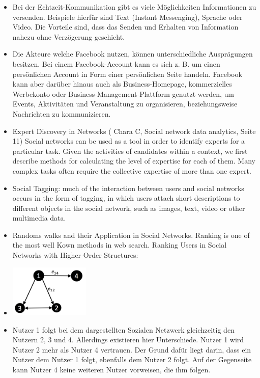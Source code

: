\begin{itemize}
\item Bei der Echtzeit-Kommunikation gibt es viele Möglichkeiten Informationen zu versenden. Beispiele hierfür sind Text (Instant Messenging), Sprache oder Video. Die Vorteile sind, dass das Senden und Erhalten von Information nahezu ohne Verzögerung geschieht.
\item Die Akteure welche Facebook nutzen, können unterschiedliche Ausprägungen besitzen. Bei einem Facebook-Account kann es sich z. B. um einen persönlichen Account in Form einer persönlichen Seite handeln. Facebook kann aber darüber hinaus auch als Business-Homepage, kommerzielles Werbekonto oder Business-Management-Plattform genutzt werden, um Events, Aktivitäten und Veranstaltung zu organisieren, beziehungsweise Nachrichten zu kommunizieren.
\item Expert Discovery in Networks ( Chara C, Social network data analytics, Seite 11) \glqq{}Social networks can be used as a tool in order to identify experts for a particular task. Given the activities of candidates within a context, we first describe methods for calculating the level of expertise for each of them. Many complex tasks often require the collective expertise of more than one expert.\grqq
\item \glqq{}Social Tagging:  much of the interaction between users and social networks occurs in the form of tagging, in which users attach short descriptions to different objects in the social network, such as images, text, video or other multimedia data.\grqq
\item Randoms walks and their Application in Social Networks. Ranking is one of the most well Kown methods in web search. Ranking Users in Social Networks with Higher-Order Structures:
\item \includegraphics[width=0.3\textwidth]{bilder/social-network-users.png}
\item Nutzer 1 folgt bei dem dargestellten Sozialen Netzwerk  gleichzeitig den Nutzern 2, 3 und 4. Allerdings existieren hier Unterschiede. Nutzer 1 wird Nutzer 2 mehr als Nutzer 4 vertrauen. Der Grund dafür liegt darin, dass ein Nutzer dem Nutzer 1 folgt, ebenfalls dem Nutzer 2 folgt. Auf der Gegenseite kann Nutzer 4 keine weiteren Nutzer vorweisen, die ihm folgen.

\end{itemize}
